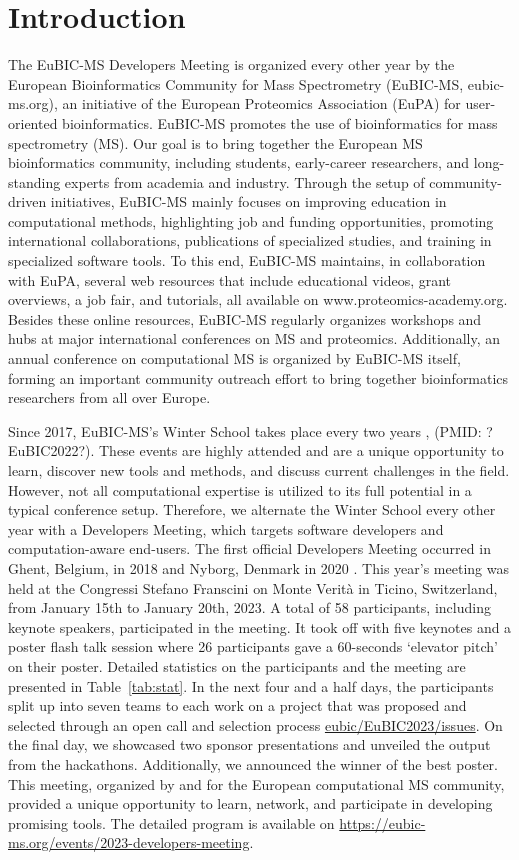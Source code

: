 \section{Introduction}
The EuBIC-MS Developers Meeting is organized every other year by the European Bioinformatics Community for Mass Spectrometry (EuBIC-MS, eubic-ms.org), an initiative of the European Proteomics Association (EuPA) for user-oriented bioinformatics. EuBIC-MS promotes the use of bioinformatics for mass spectrometry (MS). Our goal is to bring together the European MS bioinformatics community, including students, early-career researchers, and long-standing experts from academia and industry. Through the setup of community-driven initiatives, EuBIC-MS mainly focuses on improving education in computational methods, highlighting job and funding opportunities, promoting international collaborations, publications of specialized studies, and training in specialized software tools. To this end, EuBIC-MS maintains, in collaboration with EuPA, several web resources that include educational videos, grant overviews, a job fair, and tutorials, all available on www.proteomics-academy.org. Besides these online resources, EuBIC-MS regularly organizes workshops and hubs at major international conferences on MS and proteomics. Additionally, an annual conference on computational MS is organized by EuBIC-MS itself, forming an important community outreach effort to bring together bioinformatics researchers from all over Europe.

Since 2017, EuBIC-MS's Winter School takes place every two years \citep{pmid28385664}, (PMID: ?EuBIC2022?). These events are highly attended and are a unique opportunity to learn, discover new tools and methods, and discuss current challenges in the field. However, not all computational expertise is utilized to its full potential in a typical conference setup. Therefore, we alternate the Winter School every other year with a Developers Meeting, which targets software developers and computation-aware end-users. The first official Developers Meeting occurred in Ghent, Belgium, in 2018 \citep{pmid29864591} and Nyborg, Denmark in 2020 \citep{EuBIC-MS2020}. This year's meeting was held at the Congressi Stefano Franscini on Monte Verità in Ticino, Switzerland, from January 15th to January 20th, 2023. A total of 58 participants, including keynote speakers, participated in the meeting.
It took off with five keynotes and a poster flash talk session where 26 participants gave a 60-seconds `elevator pitch' on their poster. Detailed statistics on the participants and the meeting are presented in Table~\ref{tab:stat}. In the next four and a half days, the participants split up into seven teams to each work on a project that was proposed and selected through an open call and selection process \href{https://github.com/eubic/EuBIC2023/issues}{eubic/EuBIC2023/issues}. On the final day, we showcased two sponsor presentations and unveiled the output from the hackathons. Additionally, we announced the winner of the best poster. This meeting, organized by and for the European computational MS community, provided a unique opportunity to learn, network, and participate in developing promising tools. The detailed program is available on \url{https://eubic-ms.org/events/2023-developers-meeting}.

